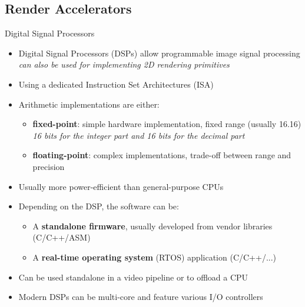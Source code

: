 \subsection{Render Accelerators}

\begin{frame}{Digital Signal Processors}
  \begin{itemize}
  \item Digital Signal Processors (DSPs) allow programmable image signal processing\\
    \textit{can also be used for implementing 2D rendering primitives}
  \item Using a dedicated Instruction Set Architectures (ISA)
  \item Arithmetic implementations are either:
    \begin{itemize}
    \item \textbf{fixed-point}: simple hardware implementation, fixed range (usually 16.16)\\
      \textit{16 bits for the integer part and 16 bits for the decimal part}
    \item \textbf{floating-point}: complex implementations, trade-off between range and precision
    \end{itemize}
  \item Usually more power-efficient than general-purpose CPUs
  \item Depending on the DSP, the software can be:
    \begin{itemize}
    \item A \textbf{standalone firmware}, usually developed from vendor libraries (C/C++/ASM)
    \item A \textbf{real-time operating system} (RTOS) application (C/C++/...)
    \end{itemize}
  \item Can be used standalone in a video pipeline or to offload a CPU
  \item Modern DSPs can be multi-core and feature various I/O controllers
  \end{itemize}
\end{frame}

